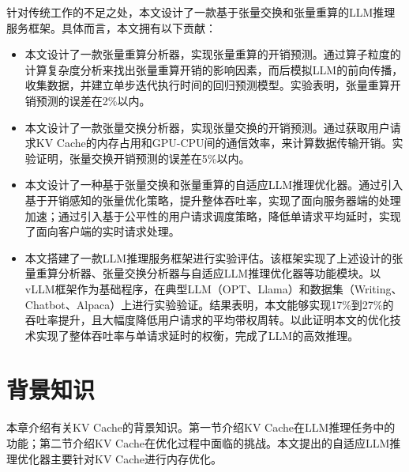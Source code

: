 \documentclass[a4paper, nosysfonts]{hpcchina}
\begin{document}
针对传统工作的不足之处，本文设计了一款基于张量交换和张量重算的LLM推理服务框架。具体而言，本文拥有以下贡献：
\begin{itemize}
  \item 本文设计了一款张量重算分析器，实现张量重算的开销预测。通过算子粒度的计算复杂度分析来找出张量重算开销的影响因素，而后模拟LLM的前向传播，收集数据，并建立单步迭代执行时间的回归预测模型。实验表明，张量重算开销预测的误差在2\%以内。
  \item 本文设计了一款张量交换分析器，实现张量交换的开销预测。通过获取用户请求KV Cache的内存占用和GPU-CPU间的通信效率，来计算数据传输开销。实验证明，张量交换开销预测的误差在5\%以内。
  \item 本文设计了一种基于张量交换和张量重算的自适应LLM推理优化器。通过引入基于开销感知的张量优化策略，提升整体吞吐率，实现了面向服务器端的处理加速；通过引入基于公平性的用户请求调度策略，降低单请求平均延时，实现了面向客户端的实时请求处理。
  \item 本文搭建了一款LLM推理服务框架进行实验评估。该框架实现了上述设计的张量重算分析器、张量交换分析器与自适应LLM推理优化器等功能模块。以vLLM框架作为基础程序，在典型LLM（OPT、Llama）和数据集（Writing、Chatbot、Alpaca）上进行实验验证。结果表明，本文能够实现17\%到27\%的吞吐率提升，且大幅度降低用户请求的平均带权周转。以此证明本文的优化技术实现了整体吞吐率与单请求延时的权衡，完成了LLM的高效推理。
\end{itemize}

\section{背景知识}
本章介绍有关KV Cache的背景知识。第一节介绍KV Cache在LLM推理任务中的功能；第二节介绍KV Cache在优化过程中面临的挑战。本文提出的自适应LLM推理优化器主要针对KV Cache进行内存优化。
\end{document}
